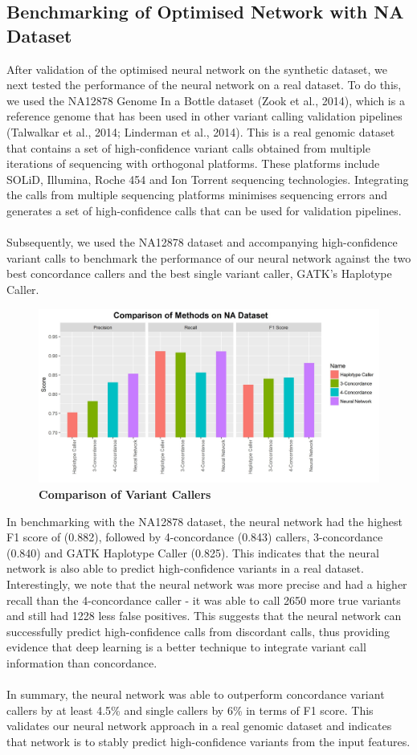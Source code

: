 \documentclass{article}
\begin{document}
\subsection{Benchmarking of Optimised Network with NA Dataset}
After validation of the optimised neural network on the synthetic dataset, we next tested the performance of the neural network on a real dataset. To do this, we used the NA12878 Genome In a Bottle dataset (Zook et al., 2014), which is a reference genome that has been used in other variant calling validation pipelines (Talwalkar et al., 2014; Linderman et al., 2014). This is a real genomic dataset that contains a set of high-confidence variant calls obtained from multiple iterations of sequencing with orthogonal platforms. These platforms include SOLiD, Illumina, Roche 454 and Ion Torrent sequencing technologies. Integrating the calls from multiple sequencing platforms minimises sequencing errors and generates a set of high-confidence calls that can be used for validation pipelines. \\\\ Subsequently, we used the NA12878 dataset and accompanying high-confidence variant calls to benchmark the performance of our neural network against the two best concordance callers and the best single variant caller, GATK's Haplotype Caller. 
\begin{figure}[H]
\includegraphics[width=\textwidth]{naheadsupcomparison.jpg}
\caption{\textbf{Comparison of Variant Callers}}
\centering
\end{figure}
In benchmarking with the NA12878 dataset, the neural network had the highest F1 score of (0.882), followed by 4-concordance (0.843) callers, 3-concordance (0.840) and GATK Haplotype Caller (0.825). This indicates that the neural network is also able to predict high-confidence variants in a real dataset. Interestingly, we note that the neural network was more precise and had a higher recall than the 4-concordance caller - it was able to call 2650 more true variants and still had 1228 less false positives. This suggests that the neural network can successfully predict high-confidence calls from discordant calls, thus providing evidence that deep learning is a better technique to integrate variant call information than concordance. 
\\\\
In summary, the neural network was able to outperform concordance variant callers by at least 4.5\% and single callers by 6\% in terms of F1 score. This validates our neural network approach in a real genomic dataset and indicates that network is to stably predict high-confidence variants from the input features.
\newpage
\end{document}
